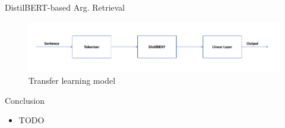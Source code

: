 \documentclass[english]{mlutalk}
\begin{document}
\begin{frame}{DistilBERT-based Arg. Retrieval~\cite{AlhamzehBEM2021}}
  \begin{figure}
    \centering
    \includegraphics[width=1\linewidth]{figures/distilbert-based-arg-retrieval-processing.pdf}
    \caption{Transfer learning model}
    \label{processing}
  \end{figure}
\end{frame}

\begin{frame}{Conclusion}
  \begin{itemize}
    \item TODO
  \end{itemize}
  \thankyou
\end{frame}

\appendix
\section{\appendixname}

\bibliographyframe
\end{document}
